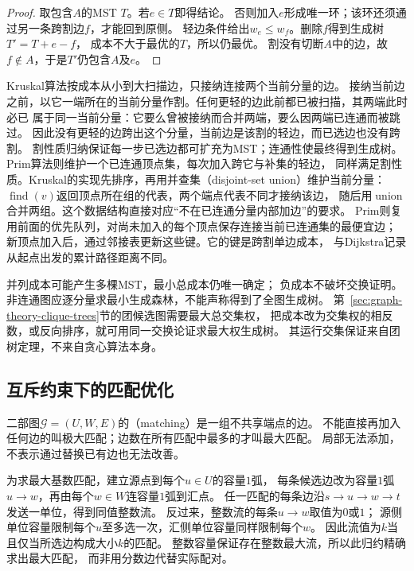 \begin{proof}
取包含\(A\)的MST \(T\)。若\(e\in T\)即得结论。
否则加入\(e\)形成唯一环；该环还须通过另一条跨割边\(f\)，才能回到原侧。
轻边条件给出\(w_e\leq w_f\)。删除\(f\)得到生成树\(T'=T+e-f\)，
成本不大于最优的\(T\)，所以仍最优。
割没有切断\(A\)中的边，故\(f\notin A\)，于是\(T'\)仍包含\(A\)及\(e\)。
\end{proof}

Kruskal算法按成本从小到大扫描边，只接纳连接两个当前分量的边。
接纳当前边之前，以它一端所在的当前分量作割。任何更轻的边此前都已被扫描，其两端此时必已
属于同一当前分量：它要么曾被接纳而合并两端，要么因两端已连通而被跳过。
因此没有更轻的边跨出这个分量，当前边是该割的轻边，而已选边也没有跨割。
割性质归纳保证每一步已选边都可扩充为MST；连通性使最终得到生成树。
Prim算法则维护一个已连通顶点集，每次加入跨它与补集的轻边，
同样满足割性质。Kruskal的实现先排序，再用并查集（disjoint-set union）维护当前分量：
\(\operatorname{find}(v)\)返回顶点所在组的代表，两个端点代表不同才接纳该边，
随后用\(\operatorname{union}\)合并两组。这个数据结构直接对应“不在已连通分量内部加边”的要求。
Prim则复用前面的优先队列，对尚未加入的每个顶点保存连接当前已连通集的最便宜边；
新顶点加入后，通过邻接表更新这些键。它的键是跨割单边成本，
与Dijkstra记录从起点出发的累计路径距离不同。

并列成本可能产生多棵MST，最小总成本仍唯一确定；
负成本不破坏交换证明。非连通图应逐分量求最小生成森林，不能声称得到了全图生成树。
第~\ref{sec:graph-theory-clique-trees}节的团候选图需要最大总交集权，
把成本改为交集权的相反数，或反向排序，就可用同一交换论证求最大权生成树。
其运行交集保证来自团树定理，不来自贪心算法本身。

\subsection{互斥约束下的匹配优化}

二部图\(\mathcal G=(U,W,E)\)的（matching）是一组不共享端点的边。
不能直接再加入任何边的叫极大匹配；边数在所有匹配中最多的才叫最大匹配。
局部无法添加，不表示通过替换已有边也无法改善。

为求最大基数匹配，建立源点到每个\(u\in U\)的容量\(1\)弧，
每条候选边改为容量\(1\)弧\(u\to w\)，再由每个\(w\in W\)连容量\(1\)弧到汇点。
任一匹配的每条边沿\(s\to u\to w\to t\)发送一单位，得到同值整数流。
反过来，整数流的每条\(u\to w\)取值为\(0\)或\(1\)；
源侧单位容量限制每个\(u\)至多选一次，汇侧单位容量同样限制每个\(w\)。
因此流值为\(k\)当且仅当所选边构成大小\(k\)的匹配。
整数容量保证存在整数最大流，所以此归约精确求出最大匹配，
而非用分数边代替实际配对。

